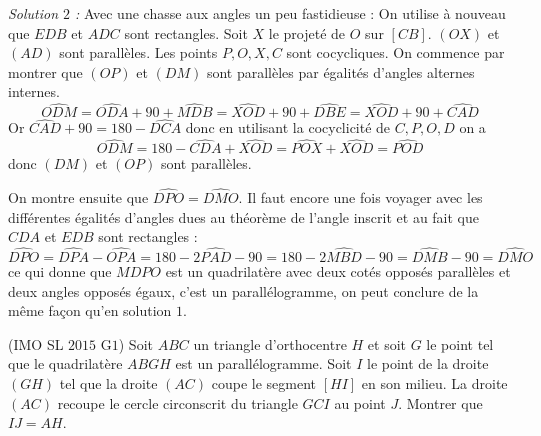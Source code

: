 \begin{sol}
\bigskip

\textit{Solution $2$ :} Avec une chasse aux angles un peu fastidieuse :
On utilise à nouveau que $EDB$ et $ADC$ sont rectangles. Soit $X$ le projeté de $O$ sur $[CB]$. $(OX)$ et $(AD)$ sont parallèles. Les points $P,O,X,C$ sont cocycliques. On commence par montrer que $(OP)$ et $(DM)$ sont parallèles par égalités d'angles alternes internes.
$$\widehat{ODM}=\widehat{ODA}+90+\widehat{MDB}=\widehat{XOD}+90+\widehat{DBE}=\widehat{XOD}+90+\widehat{CAD}$$
Or $\widehat{CAD}+90=180-\widehat{DCA}$ donc en utilisant la cocyclicité de $C,P,O,D$ on a
$$\widehat{ODM}=180-\widehat{CDA}+\widehat{XOD}=\widehat{POX}+\widehat{XOD}=\widehat{POD}$$ donc $(DM)$ et $(OP)$ sont parallèles.

On montre ensuite que $\widehat{DPO}=\widehat{DMO}$. Il faut encore une fois voyager avec les différentes égalités d'angles dues au théorème de l'angle inscrit et au fait que $CDA$ et $EDB$ sont rectangles :
$$\widehat{DPO}=\widehat{DPA}-\widehat{OPA}=180-2\widehat{PAD}-90=180-2\widehat{MBD}-90=\widehat{DMB}-90=\widehat{DMO}$$
ce qui donne que $MDPO$ est un quadrilatère avec deux cotés opposés parallèles et deux angles opposés égaux, c'est un parallélogramme, on peut conclure de la même façon qu'en solution $1$.
\end{sol}


\begin{exo}
(IMO SL $2015$ G$1$)
Soit $ABC$ un triangle d'orthocentre $H$ et soit $G$ le point tel que le quadrilatère $ABGH$ est un parall\'elogramme. Soit $I$ le point de la droite $(GH)$ tel que la droite $(AC)$ coupe le segment $[HI]$ en son milieu. La droite $(AC)$ recoupe le cercle circonscrit du triangle $GCI$ au point $J$. Montrer que $IJ=AH$.
\end{exo}


